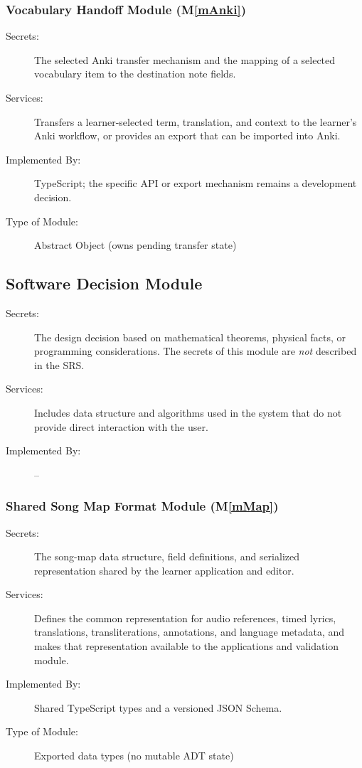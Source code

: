 \documentclass[12pt, titlepage]{article}
\newcommand{\mref}[1]{M\ref{#1}}
\begin{document}
\subsubsection{Vocabulary Handoff Module (\mref{mAnki})}

\begin{description}
\item[Secrets:] The selected Anki transfer mechanism and the mapping of a
  selected vocabulary item to the destination note fields.
\item[Services:] Transfers a learner-selected term, translation, and context
  to the learner's Anki workflow, or provides an export that can be imported
  into Anki.
\item[Implemented By:] TypeScript; the specific API or export mechanism remains
  a development decision.
\item[Type of Module:] Abstract Object (owns pending transfer state)
\end{description}


\subsection{Software Decision Module}

\begin{description}
\item[Secrets:] The design decision based on mathematical theorems, physical
  facts, or programming considerations. The secrets of this module are
  \emph{not} described in the SRS.
\item[Services:] Includes data structure and algorithms used in the system that
  do not provide direct interaction with the user. 
\item[Implemented By:] --
\end{description}

\subsubsection{Shared Song Map Format Module (\mref{mMap})}

\begin{description}
\item[Secrets:] The song-map data structure, field definitions, and serialized
  representation shared by the learner application and editor.
\item[Services:] Defines the common representation for audio references,
  timed lyrics, translations, transliterations, annotations, and language
  metadata, and makes that representation available to the applications and
  validation module.
\item[Implemented By:] Shared TypeScript types and a versioned JSON Schema.
\item[Type of Module:] Exported data types (no mutable ADT state)
\end{description}
\end{document}
